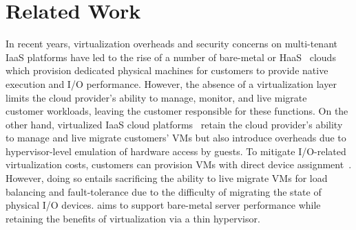 
\section{Related Work}
In recent years, virtualization overheads and security concerns on 
multi-tenant IaaS platforms have led to the rise of a 
number of bare-metal or HaaS~\cite{softlayer,oracle,zenlayer,vultr,m2}
clouds which provision dedicated physical machines for customers
to provide native execution and I/O performance.
However, the absence of a virtualization layer 
limits the cloud provider's ability to manage, monitor, 
and live migrate~\cite{clark:2005,postcopy-osr}
customer workloads, leaving the customer responsible for 
these functions.
On the other hand, virtualized IaaS cloud platforms~\cite{gcp,azure,ec2}
retain the cloud provider's ability to manage and live migrate customers'
VMs but also introduce overheads  due to
hypervisor-level emulation of hardware access by guests. To mitigate I/O-related 
virtualization costs, customers can provision VMs with 
direct device assignment~\cite{intelvtd-paper,intelvtd-manual}. 
However, doing so entails sacrificing the ability 
to live migrate VMs for load balancing and fault-tolerance
due to the difficulty of migrating the state of physical I/O devices.
\na aims to  support bare-metal server performance
while retaining the benefits of virtualization via a 
thin hypervisor.


